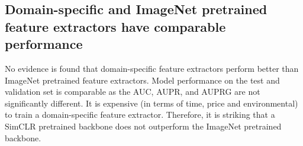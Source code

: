 \subsection{Domain-specific and ImageNet pretrained feature extractors have comparable performance}
No evidence is found that domain-specific feature extractors perform better than ImageNet pretrained feature extractors.
Model performance on the test and validation set is comparable as the AUC, AUPR, and AUPRG are not significantly different.
It is expensive (in terms of time, price and environmental) to train a domain-specific feature extractor.
Therefore, it is striking that a SimCLR pretrained backbone does not outperform the ImageNet pretrained backbone.
